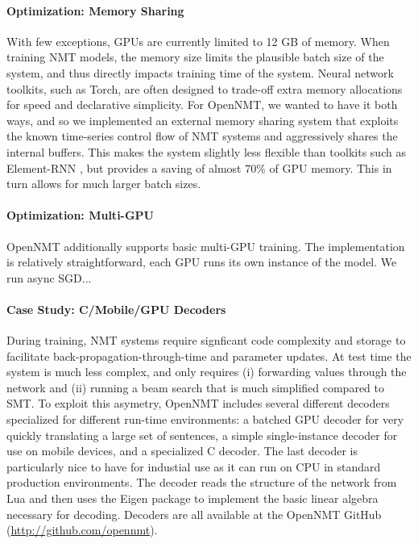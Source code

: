 \documentclass[11pt]{article}
\begin{document}
\paragraph{Optimization: Memory Sharing}

With few exceptions, GPUs are currently limited to 12 GB of
memory. When training NMT models, the memory size limits the plausible
batch size of the system, and thus directly impacts training time of
the system. Neural network toolkits, such as Torch, are often designed
to trade-off extra memory allocations for speed and declarative
simplicity. For OpenNMT, we wanted to have it both ways, and so we
implemented an external memory sharing system that exploits the known
time-series control flow of NMT systems and aggressively shares the
internal buffers. This makes the system slightly less flexible than
toolkits such as Element-RNN \cite{DBLP:journals/corr/LeonardWW15ss},
but provides a saving of almost 70\% of GPU memory. This in turn
allows for much larger batch sizes.


\paragraph{Optimization: Multi-GPU} OpenNMT additionally supports basic multi-GPU
training. The implementation is relatively straightforward, each GPU
runs its own instance of the model. We run async SGD...


\paragraph{Case Study: C/Mobile/GPU Decoders} During training, NMT
systems require signficant code complexity and storage to facilitate
back-propagation-through-time and parameter updates. At test time the
system is much less complex, and only requires (i) forwarding values
through the network and (ii) running a beam search that is much
simplified compared to SMT. To exploit this asymetry, OpenNMT includes
several different decoders specialized for different run-time
environments: a batched GPU decoder for very quickly translating a
large set of sentences, a simple single-instance decoder for use on
mobile devices, and a specialized C decoder. The last decoder is
particularly nice to have for industial use as it can run on CPU in standard
production environments. The decoder reads the structure of the
network from Lua and then uses the Eigen package to implement the
basic linear algebra necessary for decoding. Decoders are all 
available at the OpenNMT GitHub (\url{http://github.com/opennmt}).
\end{document}
